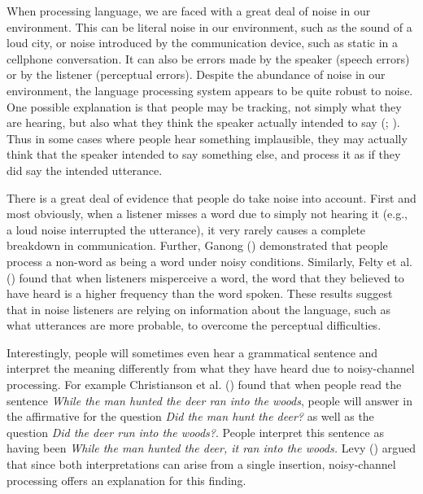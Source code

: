 \documentclass[
  12pt,
]{scrartcl}
\begin{document}
When processing language, we are faced with a great deal of noise in our
environment. This can be literal noise in our environment, such as the
sound of a loud city, or noise introduced by the communication device,
such as static in a cellphone conversation. It can also be errors made
by the speaker (speech errors) or by the listener (perceptual errors).
Despite the abundance of noise in our environment, the language
processing system appears to be quite robust to noise. One possible
explanation is that people may be tracking, not simply what they are
hearing, but also what they think the speaker actually intended to say
(; ).
Thus in some cases where people hear something implausible, they may
actually think that the speaker intended to say something else, and
process it as if they did say the intended utterance.

There is a great deal of evidence that people do take noise into
account. First and most obviously, when a listener misses a word due to
simply not hearing it (e.g., a loud noise interrupted the utterance), it
very rarely causes a complete breakdown in communication. Further,
Ganong ()
demonstrated that people process a non-word as being a word under noisy
conditions. Similarly, Felty et al.
() found that when
listeners misperceive a word, the word that they believed to have heard
is a higher frequency than the word spoken. These results suggest that
in noise listeners are relying on information about the language, such
as what utterances are more probable, to overcome the perceptual
difficulties.

Interestingly, people will sometimes even hear a grammatical sentence
and interpret the meaning differently from what they have heard due to
noisy-channel processing. For example Christianson et al.
() found that
when people read the sentence \emph{While the man hunted the deer ran
into the woods}, people will answer in the affirmative for the question
\emph{Did the man hunt the deer?} as well as the question \emph{Did the
deer run into the woods?}. People interpret this sentence as having been
\emph{While the man hunted the deer, it ran into the woods.} Levy
() argued that since
both interpretations can arise from a single insertion, noisy-channel
processing offers an explanation for this finding.
\end{document}
